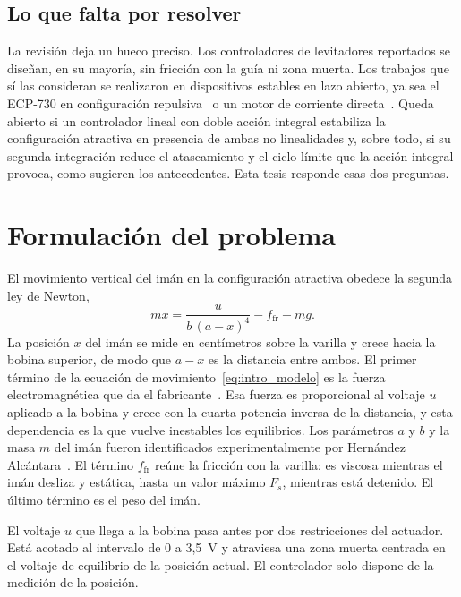 \subsection{Lo que falta por resolver}

La revisión deja un hueco preciso. Los controladores de levitadores reportados se diseñan, en su mayoría, sin fricción con la guía ni zona muerta. Los trabajos que sí las consideran se realizaron en dispositivos estables en lazo abierto, ya sea el ECP-730 en configuración repulsiva~\cite{diana_tesis,alcantara} o un motor de corriente directa~\cite{perez}. Queda abierto si un controlador lineal con doble acción integral estabiliza la configuración atractiva en presencia de ambas no linealidades y, sobre todo, si su segunda integración reduce el atascamiento y el ciclo límite que la acción integral provoca, como sugieren los antecedentes. Esta tesis responde esas dos preguntas.

\section{Formulación del problema}

El movimiento vertical del imán en la configuración atractiva obedece la segunda ley de Newton,
\begin{equation}
m\ddot{x} = \frac{u}{b\,(a-x)^4} - f_{\text{fr}} - mg .
\label{eq:intro_modelo}
\end{equation}
La posición $x$ del imán se mide en centímetros sobre la varilla y crece hacia la bobina superior, de modo que $a-x$ es la distancia entre ambos. El primer término de la ecuación de movimiento~\eqref{eq:intro_modelo} es la fuerza electromagnética que da el fabricante~\cite{parks}. Esa fuerza es proporcional al voltaje $u$ aplicado a la bobina y crece con la cuarta potencia inversa de la distancia, y esta dependencia es la que vuelve inestables los equilibrios. Los parámetros $a$ y $b$ y la masa $m$ del imán fueron identificados experimentalmente por Hernández Alcántara~\cite{diana_tesis}. El término $f_{\text{fr}}$ reúne la fricción con la varilla: es viscosa mientras el imán desliza y estática, hasta un valor máximo $F_s$, mientras está detenido. El último término es el peso del imán.

El voltaje $u$ que llega a la bobina pasa antes por dos restricciones del actuador. Está acotado al intervalo de 0 a 3{,}5~V y atraviesa una zona muerta centrada en el voltaje de equilibrio de la posición actual. El controlador solo dispone de la medición de la posición.


